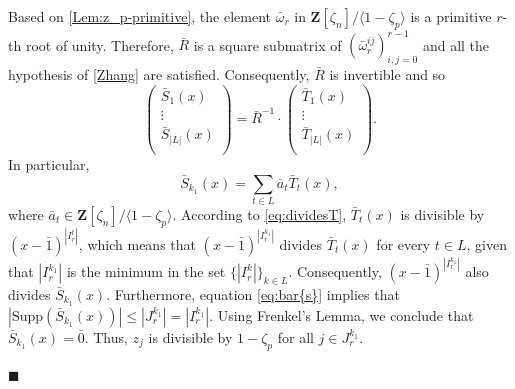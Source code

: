 \documentclass[10pt,a4paper]{amsart}
\newenvironment{proofofB}{{\bf {Proof of Theorem \ref{Thm:B}.} }}{\hfill $\blacksquare$ \\}
\def\Z{\mathbf{Z}}
\def\Supp{\mathrm{Supp}}
\begin{document}
\begin{proofofB}
Based on \autoref{Lem:z_p-primitive}, the element $\bar{\omega}_r$ in $\Z[\zeta_n]/\langle 1- \zeta_p \rangle $ is a primitive $r$-th root of unity. Therefore, $\bar{R}$ is a square submatrix of $(\bar{\omega}_r^{ij})_{i,j = 0}^{r-1}$ and all the  hypothesis of \autoref{Zhang} are satisfied. Consequently, $\bar{R}$ is invertible and so 
\begin{equation*}
   \left( \begin{matrix}
    \bar{S}_1(x)\\
    \vdots\\
    \bar{S}_{|L|}(x)\\
\end{matrix}
\right)
= \bar{R}^{-1} \cdot  \left( \begin{matrix}
    \bar{T}_1(x)\\
    \vdots\\
    \bar{T}_{|L|}(x)\\
\end{matrix}
\right). 
\end{equation*}
In particular, 
\begin{equation}\label{eq:S_k1}
\bar{S}_{k_1}(x) = \sum_{t \in L} \bar{a}_t \bar{T}_t(x), 
\end{equation}
where $\bar{a}_t \in \Z[\zeta_n]/ \langle 1- \zeta_p \rangle$.  
According to \eqref{eq:dividesT}, $\bar{T}_t(x)$ is divisible by $(x-\bar{1})^{|I_r^t|}$, which means that $(x-\bar{1})^{|I_r^{k_1}|}$ divides $\bar{T}_t(x)$ for every $t \in L$, given that $|I_r^{k_1}|$ is the minimum in the set $\{ |I_r^k| \}_{k \in L}$. Consequently, $(x-\bar{1})^{|I_r^{k_1}|}$ also divides $\bar{S}_{k_1}(x)$. Furthermore, equation \eqref{eq:bar{s}} implies that $|\Supp(\bar{S}_{k_1}(x))| \leq |J_r^{k_1}| = |I_r^{k_1}|$. Using  Frenkel's Lemma, we conclude that $\bar{S}_{k_1}(x) = \bar{0}$. Thus, $z_j$ is divisible by $1-\zeta_p$ for all $j \in J_r^{k_1}$.


\end{proofofB}
\end{document}
